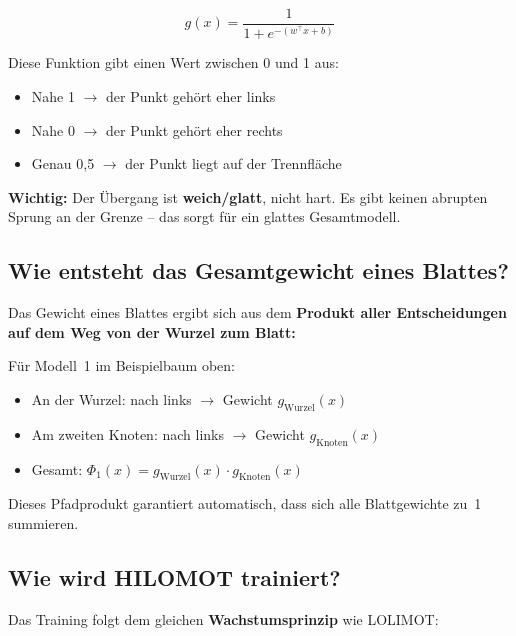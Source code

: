 \documentclass[12pt,a4paper]{article}
\begin{document}
\begin{equation}
g(x) = \frac{1}{1 + e^{-(w^\top x + b)}}
\end{equation}

Diese Funktion gibt einen Wert zwischen 0 und 1 aus:
\begin{itemize}
  \item Nahe 1 $\rightarrow$ der Punkt gehört \glqq eher links\grqq
  \item Nahe 0 $\rightarrow$ der Punkt gehört \glqq eher rechts\grqq
  \item Genau 0{,}5 $\rightarrow$ der Punkt liegt auf der Trennfläche
\end{itemize}

\textbf{Wichtig:} Der Übergang ist \textbf{weich/glatt}, nicht hart. Es gibt keinen abrupten Sprung an der Grenze -- das sorgt für ein glattes Gesamtmodell.

\subsection{Wie entsteht das Gesamtgewicht eines Blattes?}

Das Gewicht eines Blattes ergibt sich aus dem \textbf{Produkt aller Entscheidungen auf dem Weg von der Wurzel zum Blatt:}

\begin{mdframed}
Für Modell~1 im Beispielbaum oben:
\begin{itemize}
  \item An der Wurzel: \glqq nach links\grqq{} $\rightarrow$ Gewicht $g_{\text{Wurzel}}(x)$
  \item Am zweiten Knoten: \glqq nach links\grqq{} $\rightarrow$ Gewicht $g_{\text{Knoten}}(x)$
  \item Gesamt: $\Phi_1(x) = g_{\text{Wurzel}}(x) \cdot g_{\text{Knoten}}(x)$
\end{itemize}
\end{mdframed}

Dieses Pfadprodukt garantiert automatisch, dass sich alle Blattgewichte zu~1 summieren.

\subsection{Wie wird HILOMOT trainiert?}

Das Training folgt dem gleichen \textbf{Wachstumsprinzip} wie LOLIMOT:
\end{document}
